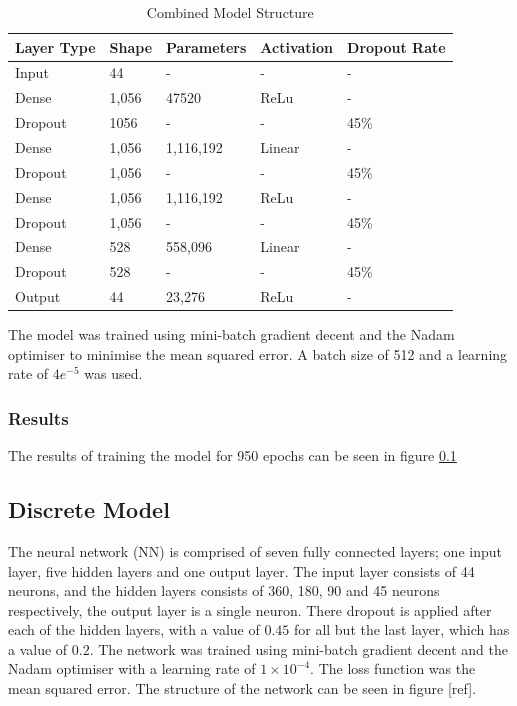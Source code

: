 \begin{table}[!h]
    \centering
    \caption{Combined Model Structure}
    \begin{tabular}{l l l l l }
        \textbf{Layer Type} & \textbf{Shape} & \textbf{Parameters} & \textbf{Activation} & \textbf{Dropout Rate} \\
        \hline
        Input & 44 & - & - & - \\
        \hline
        Dense & 1,056 & 47520 & ReLu  & - \\ 
        \hline
        Dropout & 1056 & - & - & 45\% \\
        \hline
        Dense & 1,056 & 1,116,192 & Linear  & - \\ 
        \hline
        Dropout & 1,056 & - & - & 45\% \\
        \hline
        Dense & 1,056 & 1,116,192 & ReLu  & - \\ 
        \hline
        Dropout & 1,056 & - & - & 45\% \\
        \hline
        Dense & 528 & 558,096 & Linear  & - \\ 
        \hline
        Dropout & 528 & - & - & 45\% \\
        \hline
        Output & 44 & 23,276 & ReLu & - \\
        \hline
    \end{tabular}
    \label{tab:combined_model_struct}
\end{table}

The model was trained using mini-batch gradient decent and the Nadam optimiser to minimise the mean squared error. A batch size of 512 and a learning rate of $4e^{-5}$ was used.


\subsubsection{Results}
The results of training the model for 950 epochs can be seen in figure \ref{}



\subsection{Discrete Model}

The neural network (NN) is comprised of seven fully connected layers; one input layer, five hidden layers and one output layer. The input layer consists of 44 neurons, and the hidden layers consists of 360, 180, 90 and 45 neurons respectively, the output layer is a single neuron. There dropout is applied after each of the hidden layers, with a value of $0.45$ for all but the last layer, which has a value of $0.2$. The network was trained using mini-batch gradient decent and the Nadam optimiser with a learning rate of $1 \times 10^{-4}$. The loss function was the mean squared error. The structure of the network can be seen in figure [ref].
